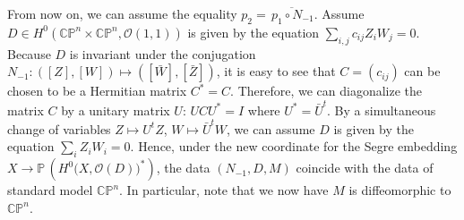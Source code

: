 \documentclass[a4paper, 12pt]{article}
\newcommand{\oX}{X}
\newcommand{\bC}{\mathbb{C}}
\newcommand{\bCP}{\mathbb{CP}^n}
\newcommand{\tCP}{\mathbb{CP}^n\times\mathbb{CP}^n}
\newcommand{\cO}{\mathcal{O}}
\begin{document}
From now on, we can assume the equality \(p_2=\overline{\,p_1\circ N_{-1}}\). Assume $D\in H^0(\bCP\times \bCP, \cO(1,1))$ is given by the equation $\sum_{i,j} c_{ij}Z_iW_j=0$. Because $D$ is invariant under the conjugation $N_{-1}: ([Z], [W])\mapsto ([\bar{W}], [\bar{Z}])$, it is easy to see that $C=(c_{ij})$ can be chosen to be a Hermitian matrix $C^*=C$. Therefore, we can diagonalize the matrix $C$ by a unitary matrix $U$: $U C U^*=I$ where $U^*=\bar{U}^t$. By a simultaneous change of variables $Z\mapsto U^t Z$, $W\mapsto \bar{U}^t W$, we can assume $D$ is given by the equation $\sum_i Z_i W_i=0$. 
Hence, under the new coordinate for the Segre embedding \(\oX \to \mathbb{P}\,(H^0\bigl(\oX,\cO(D)\bigr)^*)\), the data $(N_{-1}, D, M)$ coincide with the data of standard model $\bCP$. In particular, note that we now have $M$ is diffeomorphic to $\bCP$.

\end{document}

